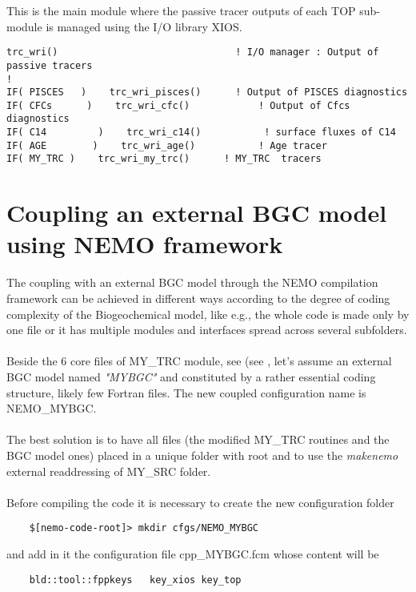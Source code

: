 \documentclass[../main/TOP_manual]{subfiles}
\begin{document}
This is the main module where the passive tracer outputs of each TOP sub-module is managed using the I/O library XIOS.

\begin{verbatim}
trc_wri()                               ! I/O manager : Output of passive tracers 
!
IF( PISCES   )    trc_wri_pisces()      ! Output of PISCES diagnostics 
IF( CFCs      )    trc_wri_cfc()            ! Output of Cfcs diagnostics
IF( C14         )    trc_wri_c14()           ! surface fluxes of C14
IF( AGE        )    trc_wri_age()           ! Age tracer
IF( MY_TRC )    trc_wri_my_trc()      ! MY_TRC  tracers
\end{verbatim}

\section{Coupling an external BGC model using NEMO framework}

The coupling with an external BGC model through the NEMO compilation framework can be achieved in different ways according to the degree of coding complexity of the Biogeochemical model, like e.g., the whole code is made only by one file or it has multiple modules and interfaces spread across several subfolders.\\ \\
Beside the 6 core files of MY\_TRC module, see (see \label{Mytrc}, let's assume an external BGC model named \textit{"MYBGC"} and constituted by a rather essential coding structure, likely few Fortran files. The new coupled configuration name is NEMO\_MYBGC. \\ \\
The best solution is to have all files (the modified MY\_TRC routines and the BGC model ones) placed in a unique folder with root  and to use the \textit{makenemo} external readdressing of MY\_SRC folder. \\ \\
Before compiling the code it is necessary to create the new configuration folder

\begin{verbatim}
    $[nemo-code-root]> mkdir cfgs/NEMO_MYBGC
\end{verbatim}

and add in it the configuration file cpp\_MYBGC.fcm whose content will be

\begin{verbatim}
    bld::tool::fppkeys   key_xios key_top
\end{verbatim}
\end{document}
